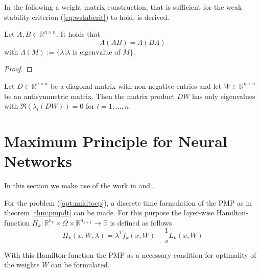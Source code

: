 \documentclass[a4paper, 12pt]{scrreprt} %
\begin{document}
In the following a weight matrix construction, that is sufficient for the weak stability criterion (\ref{eq:wstabcrit}) to hold, is derived. 

\begin{myLemma}
Let $A,B \in \mathbb{R}^{n\times n}$. It holds that 
\begin{equation}
\Lambda(AB)=\Lambda(BA)
\label{eq:eigs}
\end{equation} with $\Lambda(M) := \{\lambda \vert \lambda \text{ is eigenvalue of }M\}$.
\end{myLemma}
\begin{proof}
\end{proof}

\begin{myLemma}[Eigenvalues of $DW$]
Let $D\in \mathbb{R}^{n\times n}$ be a diagonal matrix with non negative entries and let $W \in \mathbb{R}^{n\times n}$ be an antisymmetric matrix. Then the matrix product $DW$ has only eigenvalues with $\Re(\lambda_i(DW)) = 0$ for $ i=1,\dots,n$.
\end{myLemma}

\section{Maximum Principle for Neural Networks}
In this section we make use of the work in \cite{aocatdl} and \cite{mpbafdl}.

For the problem (\ref{opt:nnldtocp}), a discrete time formulation of the \ac{PMP} as in theorem \ref{thm:pmpdt} can be made. For this purpose the layer-wise Hamilton-function $H_k: \mathbb{R}^{n_{k}} \times \Omega \times\mathbb{R}^{n_{k+1}} \to \mathbb{R} $ is defined as follows
\begin{equation}
H_k(x,W,\lambda) = \lambda^T f_k(x,W) - \frac{1}{s} L_k(x,W)
\label{eq:hamlw}
\end{equation}

With this Hamilton-function the \ac{PMP} as a necessary condition for optimality of the weights $W$ can be formulated.
\end{document}
